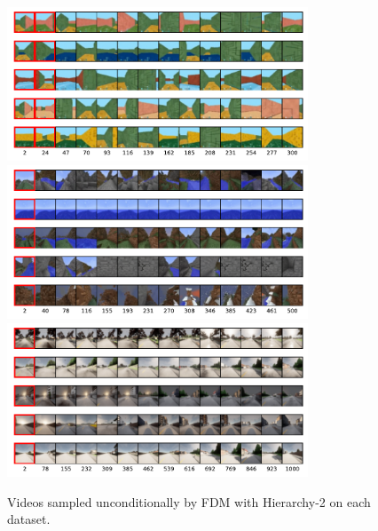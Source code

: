 \begin{figure}
    \centering
    \includegraphics[width=0.8\textwidth]{figs/fdm/mazes-uncond.pdf}
    \label{fig:fdm-mazes-uncond}
    \includegraphics[width=0.8\textwidth]{figs/fdm/minerl-uncond.pdf}
    \includegraphics[width=0.8\textwidth]{figs/fdm/carla-uncond.pdf}
    \caption{Videos sampled unconditionally by FDM with Hierarchy-2 on each dataset.}
    \label{fig:fdm-carla-uncond}
\end{figure}
